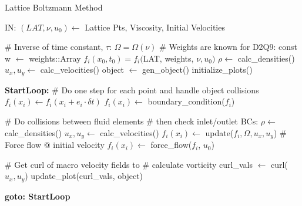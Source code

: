 \documentclass[twoside]{article}
\begin{document}
\begin{center}
	\begin{minipage}{0.6\linewidth} %
		\begin{algorithm}[H]
			\caption{Lattice Boltzmann Method} %
			\label{alg:KeyPress}   %
			\begin{algorithmic}[H]
				\STATE IN: $(LAT, \nu, u_0) \gets$ Lattice Pts, Viscosity, Initial Velocities

				\hrulefill
				\medskip

				\STATE \# Inverse of time constant, $\tau$:
				\STATE $\Omega = \Omega(\nu)$
				\STATE \# Weights are known for D2Q9:
				\STATE const w $\gets$ weights::Array
				\STATE $f_i(x_0, t_0) = f_i($LAT, weights, $\nu, u_0)$
				\STATE $\rho \gets$ calc\_densities()
				\STATE $u_x, u_y \gets$ calc\_velocities()
				\STATE object $\gets$ gen\_object()
				\STATE initialize\_plots()

				\hrulefill
				\medskip

				\STATE \textbf{StartLoop:}
				\STATE \# Do one step for each point and handle object collisions
					\STATE $f_i(x_i) \gets f_i(x_i + e_i \cdot \delta t)$
						\STATE $f_i(x_i) \gets$ boundary\_condition($f_i$)
					\ENDIF
				\ENDFOR
				\STATE

				\hrulefill
				\medskip

				\STATE \# Do collisions between fluid elements
				\STATE \# then check inlet/outlet BCs:
				\STATE $\rho \gets$ calc\_densities()
				\STATE $u_x, u_y \gets$ calc\_velocities()
					\STATE $f_i(x_i) \gets$ update($f_i, \Omega, u_x, u_y$)
						\STATE \# Force flow @ initial velocity
						\STATE $f_i(x_i) \gets$ force\_flow($f_i$, $u_0$)
					\ENDIF
				\ENDFOR
				\STATE

				\hrulefill
				\medskip

				\STATE \# Get curl of macro velocity fields to
				\STATE \# calculate vorticity
				\STATE curl\_vals $\gets$ curl($u_x, u_y$)
				\STATE update\_plot(curl\_vals, object)

				\STATE \textbf{goto: StartLoop}
			\end{algorithmic}
		\end{algorithm}
	\end{minipage}
\end{center}
\end{document}
